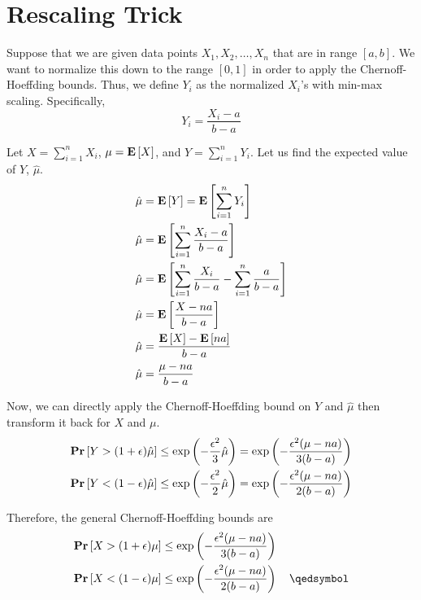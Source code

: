 \chapter{Rescaling Trick}

Suppose that we are given data points $X_1, X_2, \ldots, X_n$ that are in range $[a, b]$. We want to normalize this down to the range $[0, 1]$ in order to apply the Chernoff-Hoeffding bounds. Thus, we define $Y_i$ as the normalized $X_i$'s with min-max scaling. Specifically,
\[ Y_i = \frac{X_i - a}{b - a} \]

Let $X = \sum_{i=1}^n X_i$, $\mu = \mathbf{E}\left[X\right]$, and $Y = \sum_{i=1}^n Y_i$. Let us find the expected value of $Y$, $\hat{\mu}$.
\[
\begin{aligned}
	\hat{\mu} &= \mathbf{E}\left[Y\right] = \mathbf{E}\left[\sum_{i=1}^n Y_i\right] \\
	\hat{\mu} &= \mathbf{E}\left[\sum_{i=1}^n \frac{X_i - a}{b-a}\right] \\
	\hat{\mu} &= \mathbf{E}\left[\sum_{i=1}^n \frac{X_i}{b-a} - \sum_{i=1}^n \frac{a}{b-a}\right] \\
	\hat{\mu} &= \mathbf{E}\left[\frac{X - na}{b-a}\right] \\
	\hat{\mu} &= \frac{\mathbf{E}\left[X\right] - \mathbf{E}\left[na\right]}{b-a} \\
	\hat{\mu} &= \frac{\mu - na}{b - a}
\end{aligned}
\]

Now, we can directly apply the Chernoff-Hoeffding bound on $Y$ and $\hat{\mu}$ then transform it back for $X$ and $\mu$.
\[
\begin{aligned}
	\mathbf{Pr}\left[Y > (1 + \epsilon)\hat{\mu}\right] &\leq \exp\left(-\frac{\epsilon^2}{3}\hat{\mu}\right) = \exp\left(-\frac{\epsilon^2(\mu-na)}{3(b-a)}\right) \\
	\mathbf{Pr}\left[Y < (1 - \epsilon)\hat{\mu}\right] &\leq \exp\left(-\frac{\epsilon^2}{2}\hat{\mu}\right) = \exp\left(-\frac{\epsilon^2(\mu-na)}{2(b-a)}\right)
\end{aligned}
\]

Therefore, the general Chernoff-Hoeffding bounds are
\[
\begin{aligned}
	\pr{X > (1 + \epsilon)\mu} &\leq \exp\left(-\frac{\epsilon^2(\mu-na)}{3(b-a)}\right) \\
	\pr{X < (1 - \epsilon)\mu} &\leq \exp\left(-\frac{\epsilon^2(\mu-na)}{2(b-a)}\right) \quad \qedsymbol
\end{aligned}
\]
